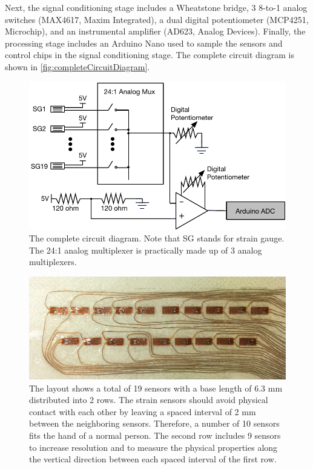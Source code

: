 \documentclass{sigchi}
\begin{document}
Next, the signal conditioning stage includes a Wheatstone bridge, 3 8-to-1 analog switches (MAX4617, Maxim Integrated), a dual digital potentiometer (MCP4251, Microchip), and an instrumental amplifier (AD623, Analog Devices). Finally, the processing stage includes an Arduino Nano used to sample the sensors and control chips in the signal conditioning stage. The complete circuit diagram is shown in \autoref{fig:completeCircuitDiagram}.

\begin{figure}
  \includegraphics[width=1\columnwidth]{figures/CompleteDiagram_v2.pdf}
  \caption{The complete circuit diagram. Note that SG stands for strain gauge. The 24:1 analog multiplexer is practically made up of 3 analog multiplexers.}
  \label{fig:completeCircuitDiagram}
\end{figure}

\begin{figure}
 \begin{center}
  \includegraphics[width=1\columnwidth]{figures/tie.png}
  \caption{The layout shows a total of 19 sensors with a base length of 6.3 mm distributed into 2 rows. The strain sensors should avoid physical contact with each other by leaving a spaced interval of 2 mm between the neighboring sensors. Therefore, a number of 10 sensors fits the hand of a normal person. The second row includes 9 sensors to increase resolution and to measure the physical properties along the vertical direction between each spaced interval of the first row.}
  \label{fig:tie}
  \end{center}
\end{figure}
\end{document}
